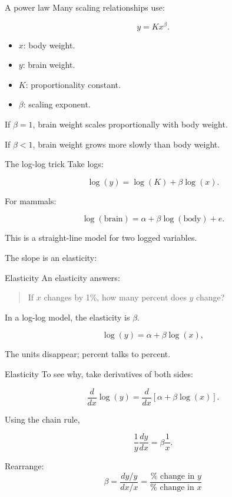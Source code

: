 \documentclass[
  ignorenonframetext,
  aspectratio=43,
]{beamer}
\providecommand{\tightlist}{%
  \setlength{\itemsep}{0pt}\setlength{\parskip}{0pt}}\usepackage{longtable,booktabs,array}
\begin{document}
\begin{frame}{A power law}
\label{a-power-law}
Many scaling relationships use:

\[
y = Kx^\beta.
\]

\begin{itemize}
\tightlist
\item
  \(x\): body weight.
\item
  \(y\): brain weight.
\item
  \(K\): proportionality constant.
\item
  \(\beta\): scaling exponent.
\end{itemize}

If \(\beta = 1\), brain weight scales proportionally with body weight.

If \(\beta < 1\), brain weight grows more slowly than body weight.
\end{frame}

\begin{frame}{The log-log trick}
\label{the-log-log-trick}
Take logs:

\[
\log(y) = \log(K) + \beta\log(x).
\]

For mammals:

\[
\log(\text{brain}) =
\alpha + \beta\log(\text{body}) + e.
\]

This is a straight-line model for two logged variables.

The slope is an elasticity:
\end{frame}

\begin{frame}{Elasticity}
\label{elasticity-1}
An elasticity answers:

\begin{quote}
If \(x\) changes by 1\%, how many percent does \(y\) change?
\end{quote}

In a log-log model, the elasticity is \(\beta\).

\[
\log(y) = \alpha + \beta\log(x),
\]

The units disappear; percent talks to percent.
\end{frame}

\begin{frame}{Elasticity}
\label{elasticity-2}
To see why, take derivatives of both sides:

\[
\frac{d}{dx}\log(y)
=
\frac{d}{dx}\left[\alpha + \beta \log(x)\right].
\]

Using the chain rule,

\[
\frac{1}{y}\frac{dy}{dx}
=
\beta \frac{1}{x}.
\]

Rearrange: \[
\beta
=
\frac{dy / y}{dx / x}
=
\frac{\%\text{ change in } y}{\%\text{ change in } x}
\]
\end{frame}
\end{document}
